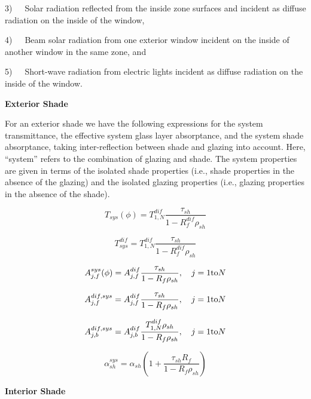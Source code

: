 3)~~~Solar radiation reflected from the inside zone surfaces and incident as diffuse radiation on the inside of the window,

4)~~~Beam solar radiation from one exterior window incident on the inside of another window in the same zone, and

5)~~~Short-wave radiation from electric lights incident as diffuse radiation on the inside of the window.

\textbf{Exterior Shade}

For an exterior shade we have the following expressions for the system transmittance, the effective system glass layer absorptance, and the system shade absorptance, taking inter-reflection between shade and glazing into account. Here, ``system'' refers to the combination of glazing and shade. The system properties are given in terms of the isolated shade properties (i.e., shade properties in the absence of the glazing) and the isolated glazing properties (i.e., glazing properties in the absence of the shade).

\begin{equation}
{T_{sys}}(\phi ) = T_{1,N}^{dif}\frac{{{\tau_{sh}}}}{{1 - R_f^{dif}{\rho_{sh}}}}
\end{equation}

\begin{equation}
T_{sys}^{dif} = T_{1,N}^{dif}\frac{{{\tau_{sh}}}}{{1 - R_f^{dif}{\rho_{sh}}}}
\end{equation}

\begin{equation}
A_{j,f}^{sys}(\phi ) = A_{j,f}^{dif}\frac{{{\tau_{sh}}}}{{1 - {R_f}{\rho_{sh}}}},\quad j = 1{\rm{to}}N
\end{equation}

\begin{equation}
A_{j,f}^{dif,sys} = A_{j,f}^{dif}\frac{{{\tau_{sh}}}}{{1 - {R_f}{\rho_{sh}}}},\quad j = 1{\rm{ to }}N
\end{equation}

\begin{equation}
A_{j,b}^{dif,sys} = A_{j,b}^{dif}\frac{{T_{1,N}^{dif}{\rho_{sh}}}}{{1 - {R_f}{\rho_{sh}}}},\quad j = 1{\rm{ to }}N
\end{equation}

\begin{equation}
\alpha_{sh}^{sys} = {\alpha_{sh}}\left( {1 + \frac{{{\tau_{sh}}{R_f}}}{{1 - {R_f}{\rho_{sh}}}}} \right)
\end{equation}

\textbf{Interior Shade}

